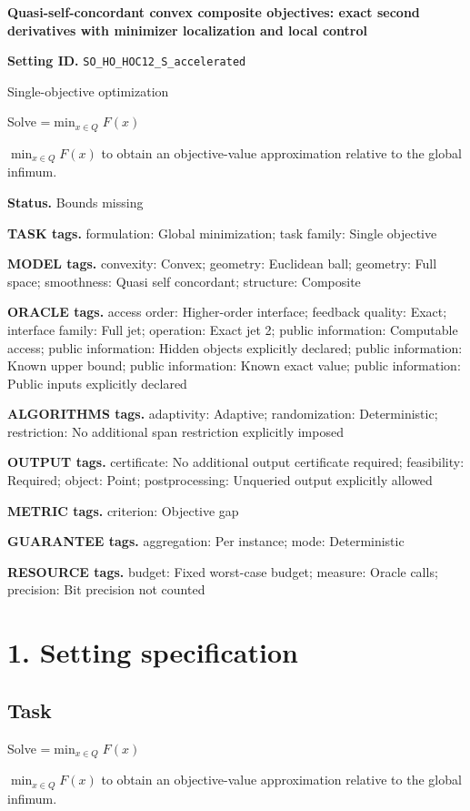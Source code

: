 \documentclass[10pt,a4paper]{article}
\newcommand{\AtlasMath}[1]{\par\begingroup\centering\setbox0=\hbox{$\displaystyle #1$}\ifdim\wd0>1.4\linewidth\typeout{ATLAS WIDE FORMULA: \the\wd0}\fi\ifdim\wd0>\linewidth\resizebox{\linewidth}{!}{\box0}\else\box0\fi\par\endgroup}
\newcommand{\AtlasInlineMath}[1]{\begingroup\setbox0=\hbox{$#1$}\ifdim\wd0>.4\linewidth\endgroup\AtlasMath{#1}\else\endgroup$#1$\fi}
\begin{document}
\raggedright

{\LARGE\bfseries\sffamily\color{AtlasNavy} Quasi-self-concordant convex composite objectives: exact second derivatives with minimizer localization and local control\par}\vspace{5pt}
\textbf{Setting ID.} \texttt{SO\_\allowbreak{}HO\_\allowbreak{}HOC12\_\allowbreak{}S\_\allowbreak{}accelerated}

Single-objective optimization

Solve \AtlasInlineMath{\min_{x\in Q}F(x)} to obtain an objective-value approximation relative to the global infimum.

\textbf{Status.} Bounds missing

\textbf{TASK tags.} formulation: Global minimization; task family: Single objective

\textbf{MODEL tags.} convexity: Convex; geometry: Euclidean ball; geometry: Full space; smoothness: Quasi self concordant; structure: Composite

\textbf{ORACLE tags.} access order: Higher-order interface; feedback quality: Exact; interface family: Full jet; operation: Exact jet 2; public information: Computable access; public information: Hidden objects explicitly declared; public information: Known upper bound; public information: Known exact value; public information: Public inputs explicitly declared

\textbf{ALGORITHMS tags.} adaptivity: Adaptive; randomization: Deterministic; restriction: No additional span restriction explicitly imposed

\textbf{OUTPUT tags.} certificate: No additional output certificate required; feasibility: Required; object: Point; postprocessing: Unqueried output explicitly allowed

\textbf{METRIC tags.} criterion: Objective gap

\textbf{GUARANTEE tags.} aggregation: Per instance; mode: Deterministic

\textbf{RESOURCE tags.} budget: Fixed worst-case budget; measure: Oracle calls; precision: Bit precision not counted

\section{1. Setting specification}
\subsection{Task}
Solve \AtlasInlineMath{\min_{x\in Q}F(x)} to obtain an objective-value approximation relative to the global infimum.
\end{document}
